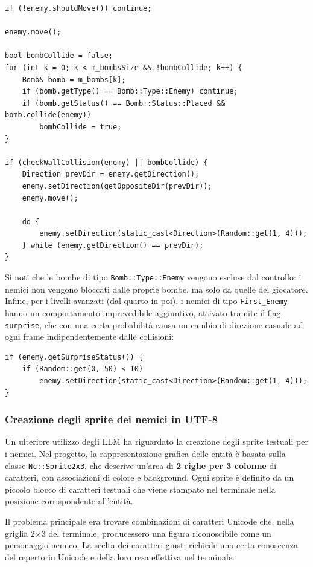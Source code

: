 \documentclass[a4paper,11pt]{article}
\begin{document}
\begin{verbatim}
if (!enemy.shouldMove()) continue;
 
enemy.move();
 
bool bombCollide = false;
for (int k = 0; k < m_bombsSize && !bombCollide; k++) {
    Bomb& bomb = m_bombs[k];
    if (bomb.getType() == Bomb::Type::Enemy) continue;
    if (bomb.getStatus() == Bomb::Status::Placed && bomb.collide(enemy))
        bombCollide = true;
}
 
if (checkWallCollision(enemy) || bombCollide) {
    Direction prevDir = enemy.getDirection();
    enemy.setDirection(getOppositeDir(prevDir));
    enemy.move();
 
    do {
        enemy.setDirection(static_cast<Direction>(Random::get(1, 4)));
    } while (enemy.getDirection() == prevDir);
}
\end{verbatim}
 
Si noti che le bombe di tipo \texttt{Bomb::Type::Enemy} vengono escluse dal
controllo: i nemici non vengono bloccati dalle proprie bombe, ma solo da quelle del
giocatore. Infine, per i livelli avanzati (dal quarto in poi), i nemici di tipo
\texttt{First\_Enemy} hanno un comportamento imprevedibile aggiuntivo, attivato tramite
il flag \texttt{surprise}, che con una certa probabilità causa un cambio di direzione
casuale ad ogni frame indipendentemente dalle collisioni:
 
\begin{verbatim}
if (enemy.getSurpriseStatus()) {
    if (Random::get(0, 50) < 10)
        enemy.setDirection(static_cast<Direction>(Random::get(1, 4)));
}
\end{verbatim}


\subsubsection{Creazione degli sprite dei nemici in UTF-8}
 
Un ulteriore utilizzo degli LLM ha riguardato la creazione degli sprite testuali
per i nemici. Nel progetto, la rappresentazione grafica delle entità è basata sulla
classe \texttt{Nc::Sprite2x3}, che descrive un'area di
\textbf{2 righe per 3 colonne} di caratteri, con associazioni di colore e background.
Ogni sprite è definito da un piccolo blocco di caratteri testuali che viene
stampato nel terminale nella posizione corrispondente all'entità.
 
Il problema principale era trovare combinazioni di caratteri Unicode che, nella
griglia 2$\times$3 del terminale, producessero una figura
riconoscibile come un personaggio nemico. La scelta dei caratteri giusti
richiede una certa conoscenza del repertorio Unicode e della loro resa effettiva nel
terminale.
 
\end{document}
